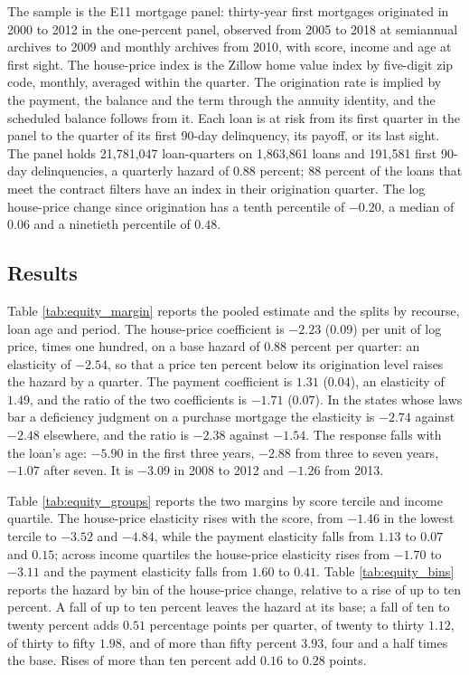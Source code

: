 The sample is the E11 mortgage panel: thirty-year first mortgages originated in 2000 to 2012 in the one-percent panel, observed from 2005 to 2018 at semiannual archives to 2009 and monthly archives from 2010, with score, income and age at first sight. The house-price index is the Zillow home value index by five-digit zip code, monthly, averaged within the quarter. The origination rate is implied by the payment, the balance and the term through the annuity identity, and the scheduled balance follows from it. Each loan is at risk from its first quarter in the panel to the quarter of its first 90-day delinquency, its payoff, or its last sight. The panel holds 21,781,047 loan-quarters on 1,863,861 loans and 191,581 first 90-day delinquencies, a quarterly hazard of 0.88 percent; 88 percent of the loans that meet the contract filters have an index in their origination quarter. The log house-price change since origination has a tenth percentile of $-0.20$, a median of $0.06$ and a ninetieth percentile of $0.48$.

\subsection{Results}

Table \ref{tab:equity_margin} reports the pooled estimate and the splits by recourse, loan age and period. The house-price coefficient is $-2.23$ ($0.09$) per unit of log price, times one hundred, on a base hazard of $0.88$ percent per quarter: an elasticity of $-2.54$, so that a price ten percent below its origination level raises the hazard by a quarter. The payment coefficient is $1.31$ ($0.04$), an elasticity of $1.49$, and the ratio of the two coefficients is $-1.71$ ($0.07$). In the states whose laws bar a deficiency judgment on a purchase mortgage the elasticity is $-2.74$ against $-2.48$ elsewhere, and the ratio is $-2.38$ against $-1.54$. The response falls with the loan's age: $-5.90$ in the first three years, $-2.88$ from three to seven years, $-1.07$ after seven. It is $-3.09$ in 2008 to 2012 and $-1.26$ from 2013.

Table \ref{tab:equity_groups} reports the two margins by score tercile and income quartile. The house-price elasticity rises with the score, from $-1.46$ in the lowest tercile to $-3.52$ and $-4.84$, while the payment elasticity falls from $1.13$ to $0.07$ and $0.15$; across income quartiles the house-price elasticity rises from $-1.70$ to $-3.11$ and the payment elasticity falls from $1.60$ to $0.41$. Table \ref{tab:equity_bins} reports the hazard by bin of the house-price change, relative to a rise of up to ten percent. A fall of up to ten percent leaves the hazard at its base; a fall of ten to twenty percent adds $0.51$ percentage points per quarter, of twenty to thirty $1.12$, of thirty to fifty $1.98$, and of more than fifty percent $3.93$, four and a half times the base. Rises of more than ten percent add $0.16$ to $0.28$ points.

